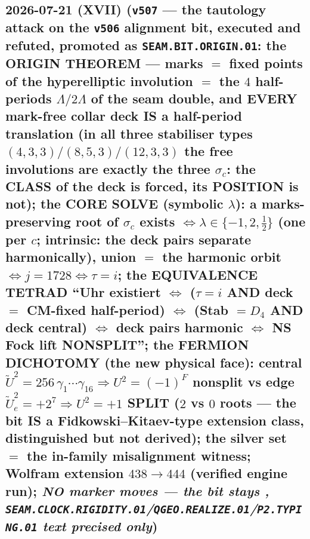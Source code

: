 \documentclass[11pt]{article}
\begin{document}
\subsection*{2026-07-21 (XVII) (\texttt{v507} --- the tautology attack on the \texttt{v506} alignment bit, executed and refuted, promoted as \texttt{SEAM.BIT.ORIGIN.01}: the ORIGIN THEOREM --- marks $=$ fixed points of the hyperelliptic involution $=$ the $4$ half-periods $\Lambda/2\Lambda$ of the seam double, and EVERY mark-free collar deck IS a half-period translation (in all three stabiliser types $(4,3,3)/(8,5,3)/(12,3,3)$ the free involutions are exactly the three $\sigma_c$: the CLASS of the deck is forced, its POSITION is not); the CORE SOLVE (symbolic $\lambda$): a marks-preserving root of $\sigma_c$ exists $\iff\lambda\in\{-1,2,\tfrac12\}$ (one per $c$; intrinsic: the deck pairs separate harmonically), union $=$ the harmonic orbit $\iff j=1728\iff\tau=i$; the EQUIVALENCE TETRAD ``Uhr existiert $\iff$ ($\tau{=}i$ AND deck $=$ CM-fixed half-period) $\iff$ (Stab $=D_4$ AND deck central) $\iff$ deck pairs harmonic $\iff$ NS Fock lift NONSPLIT''; the FERMION DICHOTOMY (the new physical face): central $\tilde U^2=256\,\gamma_1\cdots\gamma_{16}\Rightarrow U^2=(-1)^F$ nonsplit vs edge $\tilde U_e^2=+2^7\Rightarrow U^2=+1$ SPLIT ($2$ vs $0$ roots --- the bit IS a Fidkowski--Kitaev-type extension class, distinguished but not derived); the silver set $=$ the in-family misalignment witness; Wolfram extension $438\to444$ (verified engine run); \emph{NO marker moves --- the bit stays \mC, \texttt{SEAM.CLOCK.RIGIDITY.01}/\texttt{QGEO.REALIZE.01}/\texttt{P2.TYPING.01} text precised only})}
\end{document}
